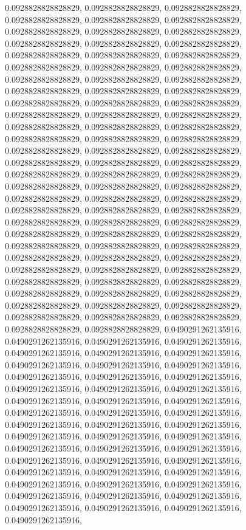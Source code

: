 \documentclass[
  ,man]{apa6}
\begin{document}
0.0928828828828829, 0.0928828828828829, 0.0928828828828829, 0.0928828828828829, 0.0928828828828829, 0.0928828828828829, 0.0928828828828829, 0.0928828828828829, 0.0928828828828829, 0.0928828828828829, 0.0928828828828829, 0.0928828828828829, 0.0928828828828829, 0.0928828828828829, 0.0928828828828829, 0.0928828828828829, 0.0928828828828829, 0.0928828828828829, 0.0928828828828829, 0.0928828828828829, 0.0928828828828829, 0.0928828828828829, 0.0928828828828829, 0.0928828828828829, 0.0928828828828829, 0.0928828828828829,
0.0928828828828829, 0.0928828828828829, 0.0928828828828829, 0.0928828828828829, 0.0928828828828829, 0.0928828828828829, 0.0928828828828829, 0.0928828828828829, 0.0928828828828829, 0.0928828828828829, 0.0928828828828829, 0.0928828828828829, 0.0928828828828829, 0.0928828828828829, 0.0928828828828829, 0.0928828828828829, 0.0928828828828829, 0.0928828828828829, 0.0928828828828829, 0.0928828828828829, 0.0928828828828829, 0.0928828828828829, 0.0928828828828829, 0.0928828828828829, 0.0928828828828829, 0.0928828828828829,
0.0928828828828829, 0.0928828828828829, 0.0928828828828829, 0.0928828828828829, 0.0928828828828829, 0.0928828828828829, 0.0928828828828829, 0.0928828828828829, 0.0928828828828829, 0.0928828828828829, 0.0928828828828829, 0.0928828828828829, 0.0928828828828829, 0.0928828828828829, 0.0928828828828829, 0.0928828828828829, 0.0928828828828829, 0.0928828828828829, 0.0928828828828829, 0.0928828828828829, 0.0928828828828829, 0.0928828828828829, 0.0928828828828829, 0.0928828828828829, 0.0928828828828829, 0.0928828828828829,
0.0928828828828829, 0.0928828828828829, 0.0928828828828829, 0.0928828828828829, 0.0928828828828829, 0.0490291262135916, 0.0490291262135916, 0.0490291262135916, 0.0490291262135916, 0.0490291262135916, 0.0490291262135916, 0.0490291262135916, 0.0490291262135916, 0.0490291262135916, 0.0490291262135916, 0.0490291262135916, 0.0490291262135916, 0.0490291262135916, 0.0490291262135916, 0.0490291262135916, 0.0490291262135916, 0.0490291262135916, 0.0490291262135916, 0.0490291262135916, 0.0490291262135916, 0.0490291262135916,
0.0490291262135916, 0.0490291262135916, 0.0490291262135916, 0.0490291262135916, 0.0490291262135916, 0.0490291262135916, 0.0490291262135916, 0.0490291262135916, 0.0490291262135916, 0.0490291262135916, 0.0490291262135916, 0.0490291262135916, 0.0490291262135916, 0.0490291262135916, 0.0490291262135916, 0.0490291262135916, 0.0490291262135916, 0.0490291262135916, 0.0490291262135916, 0.0490291262135916, 0.0490291262135916, 0.0490291262135916, 0.0490291262135916, 0.0490291262135916, 0.0490291262135916, 0.0490291262135916,
\end{document}
